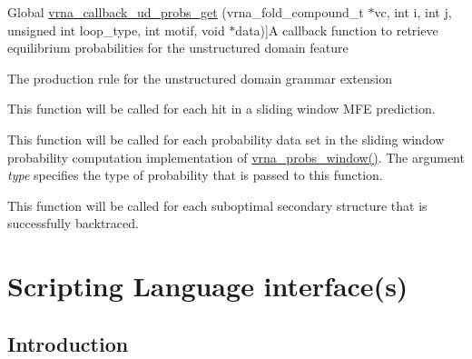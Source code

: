 \begin{DoxyRefList}
%
Global \hyperlink{group__domains__up_gaa10ba1b6f1e179ea84c5caca9cdaae67}{vrna\+\_\+callback\+\_\+ud\+\_\+probs\+\_\+get} (vrna\+\_\+fold\+\_\+compound\+\_\+t $\ast$vc, int i, int j, unsigned int loop\+\_\+type, int motif, void $\ast$data)]A callback function to retrieve equilibrium probabilities for the unstructured domain feature  
\item[\label{callbacks__callbacks000008}%
\Hypertarget{callbacks__callbacks000008}%
Global \hyperlink{group__domains__up_ga4fdfc02c1b660c07f2d887772f02a0a1}{vrna\+\_\+callback\+\_\+ud\+\_\+production} (vrna\+\_\+fold\+\_\+compound\+\_\+t $\ast$vc, void $\ast$data)]The production rule for the unstructured domain grammar extension  
\item[\label{callbacks__callbacks000003}%
\Hypertarget{callbacks__callbacks000003}%
Global \hyperlink{group__mfe__window_ga4f3e5bc214ef803074ace313cb9571b4}{vrna\+\_\+mfe\+\_\+window\+\_\+callback} (int start, int end, const char $\ast$structure, float en, void $\ast$data)]This function will be called for each hit in a sliding window M\+FE prediction.  
\item[\label{callbacks__callbacks000004}%
\Hypertarget{callbacks__callbacks000004}%
Global \hyperlink{group__part__func__window_gabe710a1182e6db69cc75329dfc9bed67}{vrna\+\_\+probs\+\_\+window\+\_\+callback} (F\+L\+T\+\_\+\+O\+R\+\_\+\+D\+BL $\ast$pr, int pr\+\_\+size, int i, int max, unsigned int type, void $\ast$data)]This function will be called for each probability data set in the sliding window probability computation implementation of \hyperlink{group__part__func__window_ga7115d012988541a65ec323c5f17a334b}{vrna\+\_\+probs\+\_\+window()}. The argument {\itshape type} specifies the type of probability that is passed to this function.  
\item[\label{callbacks__callbacks000005}%
\Hypertarget{callbacks__callbacks000005}%
Global \hyperlink{group__subopt__wuchty_gaa0270c66d04f59e750401695b8282e04}{vrna\+\_\+subopt\+\_\+callback} (const char $\ast$stucture, float energy, void $\ast$data)]This function will be called for each suboptimal secondary structure that is successfully backtraced. 
\end{DoxyRefList}\hypertarget{wrappers}{}\section{Scripting Language interface(s)}\label{wrappers}
\hypertarget{wrappers_scripting_intro}{}\subsection{Introduction}\label{wrappers_scripting_intro}
